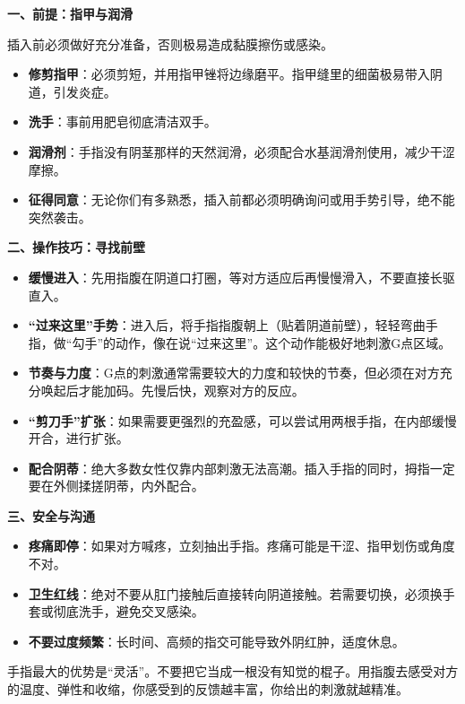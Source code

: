 \documentclass[12pt,UTF8]{ctexbook}
\begin{document}
\textbf{一、前提：指甲与润滑}

插入前必须做好充分准备，否则极易造成黏膜擦伤或感染。

\begin{itemize}
\item \textbf{修剪指甲}：必须剪短，并用指甲锉将边缘磨平。指甲缝里的细菌极易带入阴道，引发炎症。
\item \textbf{洗手}：事前用肥皂彻底清洁双手。
\item \textbf{润滑剂}：手指没有阴茎那样的天然润滑，必须配合水基润滑剂使用，减少干涩摩擦。
\item \textbf{征得同意}：无论你们有多熟悉，插入前都必须明确询问或用手势引导，绝不能突然袭击。
\end{itemize}

\textbf{二、操作技巧：寻找前壁}

\begin{itemize}
\item \textbf{缓慢进入}：先用指腹在阴道口打圈，等对方适应后再慢慢滑入，不要直接长驱直入。
\item \textbf{“过来这里”手势}：进入后，将手指指腹朝上（贴着阴道前壁），轻轻弯曲手指，做“勾手”的动作，像在说“过来这里”。这个动作能极好地刺激G点区域。
\item \textbf{节奏与力度}：G点的刺激通常需要较大的力度和较快的节奏，但必须在对方充分唤起后才能加码。先慢后快，观察对方的反应。
\item \textbf{“剪刀手”扩张}：如果需要更强烈的充盈感，可以尝试用两根手指，在内部缓慢开合，进行扩张。
\item \textbf{配合阴蒂}：绝大多数女性仅靠内部刺激无法高潮。插入手指的同时，拇指一定要在外侧揉搓阴蒂，内外配合。
\end{itemize}

\textbf{三、安全与沟通}

\begin{itemize}
\item \textbf{疼痛即停}：如果对方喊疼，立刻抽出手指。疼痛可能是干涩、指甲划伤或角度不对。
\item \textbf{卫生红线}：绝对不要从肛门接触后直接转向阴道接触。若需要切换，必须换手套或彻底洗手，避免交叉感染。
\item \textbf{不要过度频繁}：长时间、高频的指交可能导致外阴红肿，适度休息。
\end{itemize}

\begin{tcolorbox}[colback=pink!5!white,colframe=red!50!black,title=贴心小叮咛]
手指最大的优势是“灵活”。不要把它当成一根没有知觉的棍子。用指腹去感受对方的温度、弹性和收缩，你感受到的反馈越丰富，你给出的刺激就越精准。
\end{tcolorbox}
\end{document}
